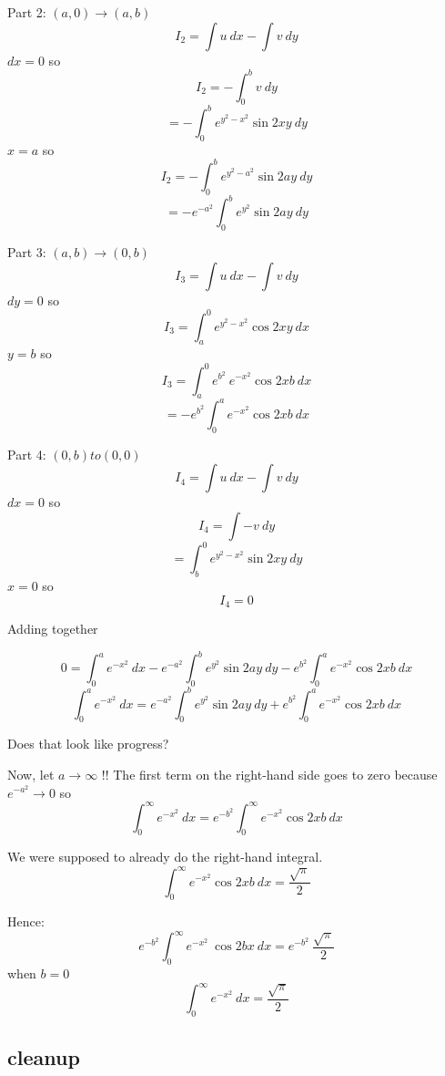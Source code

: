 \documentclass[11pt, oneside]{article}
\begin{document}
Part 2: $(a,0) \rightarrow (a,b)$
\[ I_2 = \int  u \ dx - \int v \ dy \]
$dx = 0$ so
\[ I_2 = - \int_0^b v \ dy \]
\[ = - \int_0^b e^{y^2 - x^2} \sin 2xy \ dy \]
$x = a$ so
\[ I_2 = - \int_0^b e^{y^2 - a^2} \sin 2ay \ dy \]
\[ = - e^{- a^2} \int_0^b e^{y^2} \sin 2ay \ dy \]

Part 3:  $(a,b) \rightarrow (0,b)$
\[ I_3 = \int  u \ dx - \int v \ dy \]
$dy = 0$ so
\[ I_3 = \int_a^0 e^{y^2 - x^2} \cos 2xy \ dx  \]
$y = b$ so
\[ I_3 = \int_a^0 e^{b^2} \ e^{- x^2} \cos 2xb \ dx  \]
\[ = - e^{b^2} \int_0^a e^{- x^2} \cos 2xb \ dx  \]

Part 4: $(0,b) to (0,0)$
\[ I_4 = \int  u \ dx - \int v \ dy \]
$dx = 0$ so
\[ I_4 = \int - v \ dy \]
\[ = \int_b^0 e^{y^2 - x^2} \sin 2xy \ dy \]
$x = 0$ so
\[ I_4 = 0 \]

Adding together

\[ 0 =  \int_0^a e^{- x^2} \ dx - e^{- a^2} \int_0^b e^{y^2} \sin 2ay \ dy  - e^{b^2} \int_0^a e^{- x^2} \cos 2xb \ dx \]
\[  \int_0^a e^{- x^2} \ dx = e^{- a^2} \int_0^b e^{y^2} \sin 2ay \ dy  + e^{b^2} \int_0^a e^{- x^2} \cos 2xb \ dx \]

Does that look like progress?

Now, let $a \rightarrow \infty$ !!  The first term on the right-hand side goes to zero because $e^{-a^2} \rightarrow 0$ so
\[ \int_0^{\infty} e^{- x^2} \ dx = e^{-b^2} \int_0^{\infty} e^{- x^2} \cos 2xb \ dx  \]

We were supposed to already do the right-hand integral.
\[ \int_0^{\infty} e^{- x^2} \cos 2xb \ dx = \frac{\sqrt{\pi}}{2} \]

Hence:
\[ e^{-b^2}  \int_0^{\infty} e^{- x^2} \ \cos 2bx \  dx = e^{-b^2}  \ \frac{\sqrt{\pi}}{2} \]
when $b = 0$
\[ \int_0^{\infty} e^{- x^2} \  dx = \frac{\sqrt{\pi}}{2} \]

\subsection*{cleanup}
\end{document}
